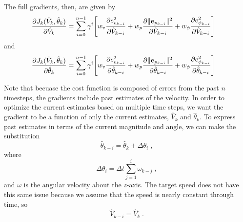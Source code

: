 The full gradients, then, are given by
\begin{align}
  \pardd[J_k(\hat{V}_{k},\hat{\theta}_{k})]{\hat{V}_{k}} &= \sum\limits_{i=0}^{n-1} \gamma^i \Bigg[
        w_v\pardd[e_{v_{k-i}}^2]{\hat{V}_{k-i}} + w_p\pardd[\norm{\e_{p_{k-i}}}^2]{\hat{V}_{k-i}} + w_\phi\pardd[e_{\phi_{k-i}}^2]{\hat{V}_{k-i}} \Bigg]
\end{align}
and
\begin{align}
  \pardd[J_k(\hat{V}_{k},\hat{\theta}_{k})]{\hat{\theta}_{k}} &= \sum\limits_{i=0}^{n-1} \gamma^i \Bigg[
        w_v\pardd[e_{v_{k-i}}^2]{\hat{\theta}_{k-i}} + w_p\pardd[\norm{\e_{p_{k-i}}}^2]{\hat{\theta}_{k-i}} + w_\phi\pardd[e_{\phi_{k-i}}^2]{\hat{\theta}_{k-i}} \Bigg]
\end{align}

Note that becuase the cost function is composed of errors from the past $n$ timesteps, the gradients include past estimates of the velocity. In order to optimize the current estimates based on multiple time steps, we want the gradient to be a function of only the current estimates, $\hat{V}_{k}$ and $\hat{\theta}_k$.
To express past estimates in terms of the current magnitude and angle, we can make the substitution
\begin{equation}
    \hat{\theta}_{k-i} = \hat{\theta}_k + \Delta \theta_i \;,
\end{equation}
where
\begin{equation}
    \Delta \theta_i = \Delta t\sum\limits_{j=1}^i \omega_{k-j} \;,
\end{equation}
and $\omega$ is the angular velocity about the $z$-axis. The target speed does not have this same issue because we assume that the speed is nearly constant through time, so
\begin{equation}
    \hat{V}_{k-i} = \hat{V}_k\;.
\end{equation}

